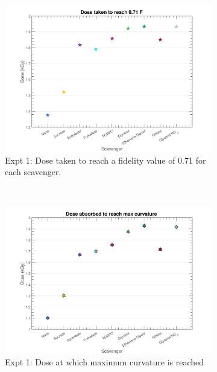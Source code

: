 \begin{figure}
    \centering
    \begin{subfigure}[b]{0.8\textwidth}
            \centering
            \includegraphics[width=\textwidth]{figures/saxs/ScavengerComparisonPlot.pdf}
            \caption{Expt 1: Dose taken to reach a fidelity value of 0.71 for each scavenger.}
            \label{fig:Scavenger plot - arbitrary fidelity value}
    \end{subfigure}
    \\
    \begin{subfigure}[b]{0.8\textwidth}
            \centering
            \includegraphics[width=\textwidth]{figures/saxs/ScavengerCurvatureComparisonPlot.pdf}
            \caption{Expt 1: Dose at which maximum curvature is reached}
            \label{fig:Scavenger plot - maximum curvature}
    \end{subfigure}
    \caption{}
    \label{fig:Combined Scavenger results - Rebecca data}
\end{figure}

